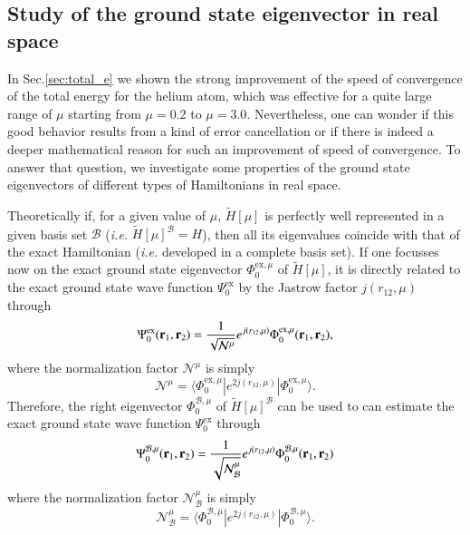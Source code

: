\documentclass[aip,jcp,reprint,noshowkeys,superscriptaddress]{revtex4-1}
\newcommand{\matelem}[3]{\langle #1 | #2 | #3 \rangle}
\newcommand{\br}[0]{{\bf {r}}}
\newcommand{\psiex}[0]{\Psi^{\text{ex}}_0}
\newcommand{\phimu}[0]{\Phi^{\text{ex},\mu}_0}
\newcommand{\phimub}[0]{\Phi^{\mathcal{B},\mu}_0}
\newcommand{\psimub}[0]{\Psi^{\mathcal{B},\mu}_0}
\newcommand{\basis}[0]{\mathcal{B}}
\begin{document}
\subsection{Study of the ground state eigenvector in real space}
In Sec.\ref{sec:total_e} we shown the strong improvement of the speed of convergence of the total energy for the helium atom, which was effective for a quite large range of $\mu$ starting from $\mu=0.2$ to $\mu=3.0$. 
Nevertheless, one can wonder if this good behavior results from a kind of error cancellation or if there is indeed a deeper mathematical reason for such an improvement of speed of convergence. 
To answer that question, we investigate some properties of the ground state eigenvectors of different types of Hamiltonians in real space. 

Theoretically if, for a given value of $\mu$, $\tilde{H}[\mu]$ is perfectly well represented in a given basis set $\mathcal{B}$ (\textit{i.e.} $\tilde{H}[\mu]^{\basis} = H$), then all its eigenvalues coincide with that of the exact Hamiltonian (\textit{i.e.} developed in a complete basis set). If one focusses now on the exact ground state eigenvector $\phimu$ of $\tilde{H}[\mu]$, it is directly related to the exact ground state wave function $\psiex$ by the Jastrow factor $j(r_{12},\mu)$ through 
\begin{equation}
 \psiex(\br{}_1,\br{}_2) =  \frac{1}{\sqrt{\mathcal{N}^{\mu}}} e^{j(r_{12},\mu)} \phimu(\br{}_1,\br{}_2), 
\end{equation}
where the normalization factor $\mathcal{N}^{\mu}$ is simply 
\begin{equation}
  \mathcal{N}^{\mu} = \matelem{\phimu}{e^{2 j(r_{12},\mu)}}{\phimu}.
\end{equation}
Therefore, the right eigenvector $\phimub$ of $\tilde{H}[\mu]^{\basis}$ can be used to can estimate the exact ground state wave function $\psiex$ through 
\begin{equation}
 \psimub(\br{}_1,\br{}_2) = \frac{1}{\sqrt{\mathcal{N}_{\basis}^{\mu}}}e^{j(r_{12},\mu)}\phimub(\br{}_1,\br{}_2)
\end{equation}
where the normalization factor $\mathcal{N}_{\basis}^{\mu}$ is simply
\begin{equation}
  \mathcal{N}_{\basis}^{\mu} = \matelem{\phimub}{e^{2 j(r_{12},\mu)}}{\phimub}.
\end{equation}
\end{document}
